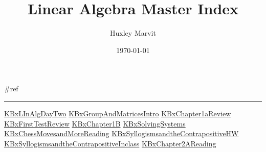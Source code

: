 \documentclass[letterpaper]{article}
\author{Huxley Marvit}
\date{\today}
\title{Linear Algebra Master Index}
\renewcommand\maketitle{}
\begin{document}
\maketitle
\#ref

\noindent\rule{\textwidth}{0.5pt}

\href{KBxLInAlgDayTwo.org}{KBxLInAlgDayTwo}
\href{KBxGroupAndMatricesIntro.org}{KBxGroupAndMatricesIntro}
\href{KBxChapter1aReview.org}{KBxChapter1aReview}
\href{KBxFirstTestReview.org}{KBxFirstTestReview}
\href{KBxChapter1B.org}{KBxChapter1B}
\href{KBxSolvingSystems.org}{KBxSolvingSystems}
\href{KBxChessMovesandMoreReading.org}{KBxChessMovesandMoreReading}
\href{KBxSyllogismsandtheContrapositiveHW.org}{KBxSyllogismsandtheContrapositiveHW}
\href{KBxSyllogismsandtheContrapositiveInclass.org}{KBxSyllogismsandtheContrapositiveInclass}
\href{KBxChapter2AReading.org}{KBxChapter2AReading}
\end{document}

